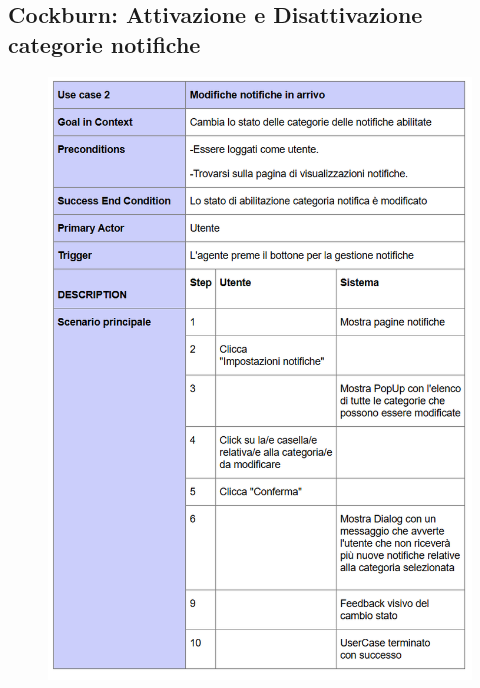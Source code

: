 \subsection{Cockburn: Attivazione e Disattivazione categorie notifiche}

\begin{figure}[H]
	\centering
	\includegraphics[width=1\linewidth]{"Immagini/cockburn/gestione notifiche principale.png"}
	\caption[CockBurn extensions: registra nuovo agente]{}
	\label{fig:gestione-notifiche-principale}
\end{figure}

\newpage

